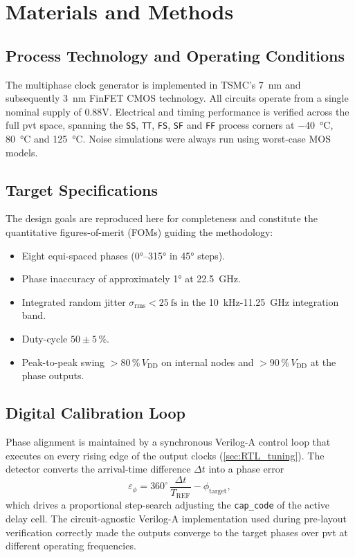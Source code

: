 \section{Materials and Methods}\label{sec:mat_methods}

\subsection{Process Technology and Operating Conditions}
The multiphase clock generator is implemented in TSMC's \SI{7}{\nano\metre} and subsequently \SI{3}{\nano\metre} FinFET CMOS technology.
All circuits operate from a single nominal supply of 0.88V.
Electrical and timing performance is verified across the full \gls{pvt} space, spanning the \texttt{SS}, \texttt{TT}, \texttt{FS}, \texttt{SF} and \texttt{FF} process corners at \SI{-40}{\celsius}, \SI{80}{\celsius} and \SI{125}{\celsius}. 
Noise simulations were always run using worst-case MOS models.

\subsection{Target Specifications}
The design goals are reproduced here for completeness and constitute the quantitative figures-of-merit (FOMs) guiding the methodology:
\begin{itemize}
  \item Eight equi-spaced phases (0°--315° in 45° steps).
  \item Phase inaccuracy of approximately \ang{1} at \SI{22.5}{\giga\hertz}.
  \item Integrated random jitter $\sigma_\mathrm{rms}<\SI{25}{\femto\second}$ in the \SI{10}{\kilo\hertz}\--\SI{11.25}{\giga\hertz} integration band.
  \item Duty-cycle $50\pm5\,\%$.
  \item Peak-to-peak swing $>80\,\%\,V_\mathrm{DD}$ on internal nodes and $>90\,\%\,V_\mathrm{DD}$ at the phase outputs.
\end{itemize}

\subsection{Digital Calibration Loop}\label{sec:methods_digital_loop}
Phase alignment is maintained by a synchronous Verilog-A control loop that executes on every rising edge of the output clocks (\ref{sec:RTL_tuning}). 
The detector converts the arrival-time difference $\Delta t$ into a phase error 
\[
\varepsilon_\phi = 360^{\circ}\,\frac{\Delta t}{T_\mathrm{REF}} - \phi_\mathrm{target},
\]
which drives a proportional step-search adjusting the \texttt{cap\_code} of the active delay cell. 
The circuit-agnostic Verilog-A implementation used during pre-layout verification correctly made the outputs converge to the target phases over \gls{pvt} at different operating frequencies.

